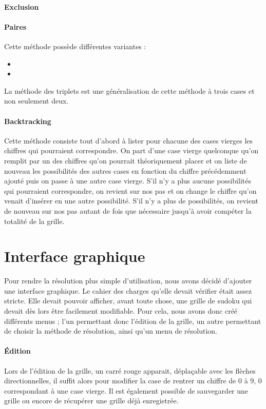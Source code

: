 \documentclass[12pt,a4paper]{report}
\begin{document}
\paragraph{Exclusion}
\paragraph{Paires} Cette méthode possède différentes variantes :
\begin{itemize}[label=--]
\item 
\item
\end{itemize} 
La méthode des triplets est une généralisation de cette méthode à trois cases et non seulement deux.
\paragraph{Backtracking} Cette méthode consiste tout d'abord à lister pour chacune des cases vierges les chiffres qui pourraient correspondre. On part d'une case vierge quelconque qu'on remplit par un des chiffres qu'on pourrait théoriquement placer et on liste de nouveau les possibilités des autres cases en fonction du chiffre précédemment ajouté puis on passe à une autre case vierge. S'il n'y a plus aucune possibilités qui pourraient correspondre, on revient sur nos pas et on change le chiffre qu'on venait d'insérer en une autre possibilité. S'il n'y a plus de possibilités, on revient de nouveau sur nos pas autant de fois que nécessaire jusqu'à avoir compéter la totalité de la grille.

\section{Interface graphique}
Pour rendre la résolution plus simple d'utilisation, nous avons décidé d'ajouter une interface graphique. Le cahier des charges qu'elle devait vérifier était assez stricte. Elle devait pouvoir afficher, avant toute chose, une grille de sudoku qui devait dès lors être facilement modifiable. Pour cela, nous avons donc créé différents menus ; l'un permettant donc l'édition de la grille, un autre permettant de choisir la méthode de résolution, ainsi qu'un menu de résolution. 

\paragraph{Édition} Lors de l'édition de la grille, un carré rouge apparait, déplaçable avec les flèches directionnelles, il suffit alors pour modifier la case de rentrer un chiffre de 0 à 9, 0 correspondant à une case vierge. Il est également possible de sauvegarder une grille ou encore de récupérer une grille déjà enregistrée.
\end{document}
